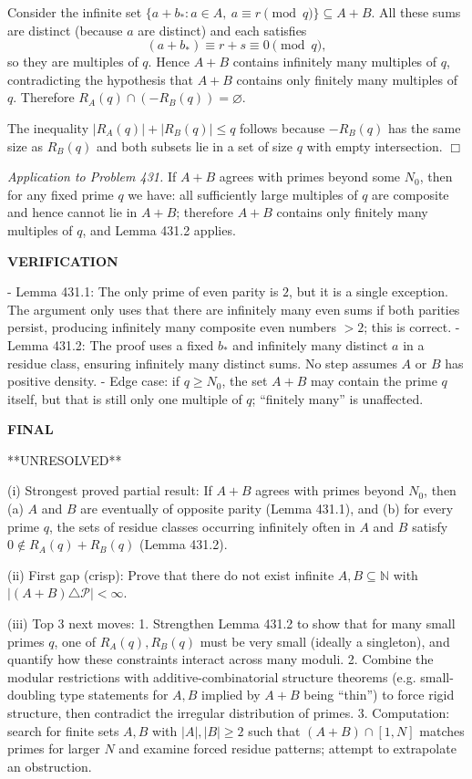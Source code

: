 Consider the infinite set $\{a+b_*: a\in A,\ a\equiv r\pmod q\}\subseteq A+B$. All these sums are distinct (because $a$ are distinct) and each satisfies
\[(a+b_*)\equiv r+s\equiv 0\pmod q,
\]
so they are multiples of $q$. Hence $A+B$ contains infinitely many multiples of $q$, contradicting the hypothesis that $A+B$ contains only finitely many multiples of $q$. Therefore $R_A(q)\cap(-R_B(q))=\varnothing$.

The inequality $|R_A(q)|+|R_B(q)|\le q$ follows because $-R_B(q)$ has the same size as $R_B(q)$ and both subsets lie in a set of size $q$ with empty intersection. \hfill$\Box$

\medskip
\noindent\emph{Application to Problem 431.}
If $A+B$ agrees with primes beyond some $N_0$, then for any fixed prime $q$ we have: all sufficiently large multiples of $q$ are composite and hence cannot lie in $A+B$; therefore $A+B$ contains only finitely many multiples of $q$, and Lemma 431.2 applies.

\medskip
\noindent\textbf{VERIFICATION}

- Lemma 431.1: The only prime of even parity is $2$, but it is a single exception. The argument only uses that there are infinitely many even sums if both parities persist, producing infinitely many composite even numbers $>2$; this is correct.
- Lemma 431.2: The proof uses a fixed $b_*$ and infinitely many distinct $a$ in a residue class, ensuring infinitely many distinct sums. No step assumes $A$ or $B$ has positive density.
- Edge case: if $q\ge N_0$, the set $A+B$ may contain the prime $q$ itself, but that is still only one multiple of $q$; ``finitely many'' is unaffected.

\medskip
\noindent\textbf{FINAL}

**UNRESOLVED**

(i) Strongest proved partial result: If $A+B$ agrees with primes beyond $N_0$, then (a) $A$ and $B$ are eventually of opposite parity (Lemma 431.1), and (b) for every prime $q$, the sets of residue classes occurring infinitely often in $A$ and $B$ satisfy $0\notin R_A(q)+R_B(q)$ (Lemma 431.2).

(ii) First gap (crisp): Prove that there do not exist infinite $A,B\subseteq\mathbb N$ with $\lvert (A+B)\triangle\mathcal P\rvert<\infty$.

(iii) Top 3 next moves:
1. Strengthen Lemma 431.2 to show that for many small primes $q$, one of $R_A(q),R_B(q)$ must be very small (ideally a singleton), and quantify how these constraints interact across many moduli.
2. Combine the modular restrictions with additive-combinatorial structure theorems (e.g. small-doubling type statements for $A,B$ implied by $A+B$ being ``thin'') to force rigid structure, then contradict the irregular distribution of primes.
3. Computation: search for finite sets $A,B$ with $|A|,|B|\ge 2$ such that $(A+B)\cap[1,N]$ matches primes for larger $N$ and examine forced residue patterns; attempt to extrapolate an obstruction.

